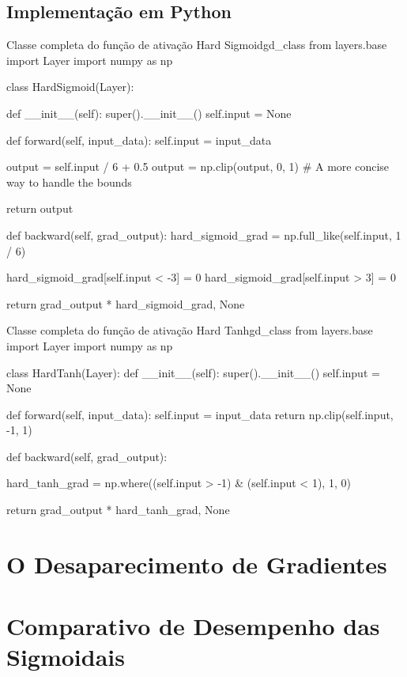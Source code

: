 \subsection{Implementação em Python}

\begin{codelisting}{Classe completa do função de ativação Hard Sigmoid}{gd_class}
from layers.base import Layer
import numpy as np

class HardSigmoid(Layer):

    def __init__(self):
        super().__init__()
        self.input = None

    def forward(self, input_data):
        self.input = input_data

        output = self.input / 6 + 0.5
        output = np.clip(output, 0, 1)  # A more concise way to handle the bounds

        return output

    def backward(self, grad_output):
        hard_sigmoid_grad = np.full_like(self.input, 1 / 6)

        hard_sigmoid_grad[self.input < -3] = 0
        hard_sigmoid_grad[self.input > 3] = 0

        return grad_output * hard_sigmoid_grad, None
\end{codelisting}

\begin{codelisting}{Classe completa do função de ativação Hard Tanh}{gd_class}
from layers.base import Layer
import numpy as np


class HardTanh(Layer):
    def __init__(self):
        super().__init__()
        self.input = None

    def forward(self, input_data):
        self.input = input_data
        return np.clip(self.input, -1, 1)

    def backward(self, grad_output):

        hard_tanh_grad = np.where((self.input > -1) & (self.input < 1), 1, 0)

        return grad_output * hard_tanh_grad, None
\end{codelisting}

\section{O Desaparecimento de Gradientes}

\section{Comparativo de Desempenho das Sigmoidais}